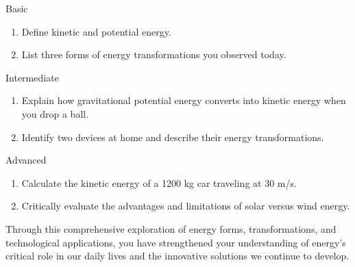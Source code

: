 \begin{tieredquestions}{Basic}
\begin{enumerate}
\item Define kinetic and potential energy.
\item List three forms of energy transformations you observed today.
\end{enumerate}
\end{tieredquestions}

\begin{tieredquestions}{Intermediate}
\begin{enumerate}
\item Explain how gravitational potential energy converts into kinetic energy when you drop a ball.
\item Identify two devices at home and describe their energy transformations.
\end{enumerate}
\end{tieredquestions}

\begin{tieredquestions}{Advanced}
\begin{enumerate}
\item Calculate the kinetic energy of a 1200 kg car traveling at 30 m/s.
\item Critically evaluate the advantages and limitations of solar versus wind energy.
\end{enumerate}
\end{tieredquestions}

Through this comprehensive exploration of energy forms, transformations, and technological applications, you have strengthened your understanding of energy's critical role in our daily lives and the innovative solutions we continue to develop.
